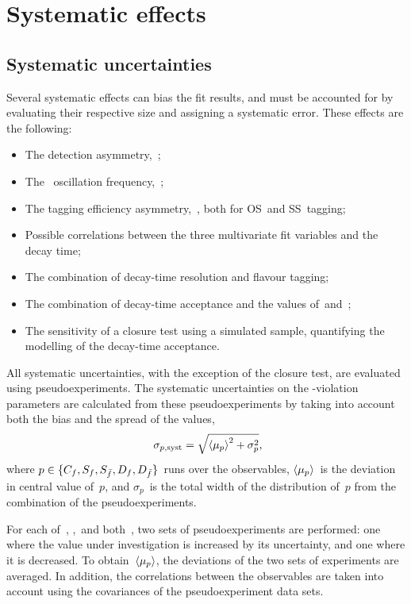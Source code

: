 \clearpage
\section{Systematic effects} \label{sec:BsDsK_TD_Syst}

\subsection{Systematic uncertainties}

Several systematic effects can bias the fit results, and must be accounted for by evaluating their respective size and assigning a systematic error.
These effects are the following:
%
\begin{itemize}
    \item The detection asymmetry,~\AdetKPi;
    \item The \Bs~oscillation frequency,~\dms;
    \item The tagging efficiency asymmetry,~\Detag, both for OS~and SS~tagging;
    \item Possible correlations between the three multivariate fit variables and the decay time;
    \item The combination of decay-time resolution and flavour tagging;
    \item The combination of decay-time acceptance and the values of~\Gs and~\DGs;
    \item The sensitivity of a closure test using a simulated sample, quantifying the modelling of the decay-time acceptance.
\end{itemize}
%
All systematic uncertainties, with the exception of the closure test, are evaluated using pseudoexperiments.
The systematic uncertainties on the \CP-violation parameters are calculated from these pseudoexperiments by taking into account both the bias and the spread of the values,
%
\begin{equation} \label{eqn:BsDsK_TD_Syst_Pseudoexperiments}
    \sigma_{p,\text{syst}} = \sqrt{\mean{\mu_{p}}^{2} + \sigma_{p}^{2}} \rlap{,}
\end{equation}
%
where \({p \in \{ C_{f}, S_{f}, S_{\bar{f}}, D_{f}, D_{\bar{f}} \}}\)~runs over the observables, \({\left\langle \mu_{p} \right\rangle}\)~is the deviation in central value of~\(p\), and \(\sigma_{p}\)~is the total width of the distribution of~\(p\) from the combination of the pseudoexperiments.

For each of~\AdetKPi, \dms,~and both~\Detag, two sets of pseudoexperiments are performed: one where the value under investigation is increased by its uncertainty, and one where it is decreased.
To obtain~\({\left\langle \mu_{p} \right\rangle}\), the deviations of the two sets of experiments are averaged.
In addition, the correlations between the observables are taken into account using the covariances of the pseudoexperiment data sets.

